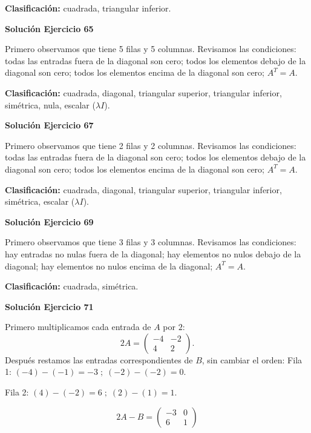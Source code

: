 \documentclass[12pt]{article}
\begin{document}
\textbf{Clasificación:} cuadrada, triangular inferior.


\par\bigskip\noindent\textbf{Solución Ejercicio 65}\par\nobreak
Primero observamos que tiene 5 filas y 5 columnas. Revisamos las condiciones: todas las entradas fuera de la diagonal son cero; todos los elementos debajo de la diagonal son cero; todos los elementos encima de la diagonal son cero; $A^T=A$.

\textbf{Clasificación:} cuadrada, diagonal, triangular superior, triangular inferior, simétrica, nula, escalar ($\lambda I$).


\par\bigskip\noindent\textbf{Solución Ejercicio 67}\par\nobreak
Primero observamos que tiene 2 filas y 2 columnas. Revisamos las condiciones: todas las entradas fuera de la diagonal son cero; todos los elementos debajo de la diagonal son cero; todos los elementos encima de la diagonal son cero; $A^T=A$.

\textbf{Clasificación:} cuadrada, diagonal, triangular superior, triangular inferior, simétrica, escalar ($\lambda I$).


\par\bigskip\noindent\textbf{Solución Ejercicio 69}\par\nobreak
Primero observamos que tiene 3 filas y 3 columnas. Revisamos las condiciones: hay entradas no nulas fuera de la diagonal; hay elementos no nulos debajo de la diagonal; hay elementos no nulos encima de la diagonal; $A^T=A$.

\textbf{Clasificación:} cuadrada, simétrica.


\par\bigskip\noindent\textbf{Solución Ejercicio 71}\par\nobreak
Primero multiplicamos cada entrada de $A$ por $2$:
\[
2A=\begin{pmatrix}-4&-2\\4&2\end{pmatrix}.
\]
Después restamos las entradas correspondientes de $B$, sin cambiar el orden:
Fila 1: $(-4)-(-1)=-3\; ;\; (-2)-(-2)=0$.

Fila 2: $(4)-(-2)=6\; ;\; (2)-(1)=1$.

\[
\boxed{2A-B=\begin{pmatrix}-3&0\\6&1\end{pmatrix}}
\]
\end{document}
